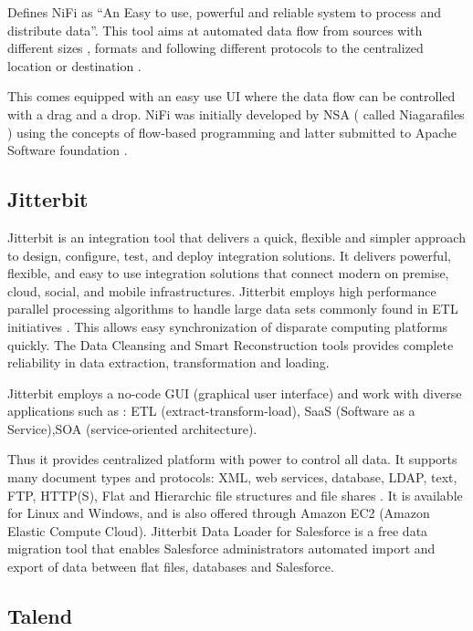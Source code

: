     \cite{www-nifi} Defines NiFi as ``An Easy to use, powerful and
    reliable system to process and distribute data''.  This tool aims
    at automated data flow from sources with different sizes , formats
    and following different protocols to the centralized location or
    destination \cite{www-hortanworks}.
    
    This comes equipped with an easy use UI where the data flow can be
    controlled with a drag and a drop.  NiFi was initially developed
    by NSA ( called Niagarafiles ) using the concepts of flow-based
    programming and latter submitted to Apache Software
    foundation \cite{www-forbes}.
    
\subsection{Jitterbit}

    Jitterbit \cite{datasheet} is an integration tool that delivers a
    quick, flexible and simpler approach to design, configure, test,
    and deploy integration solutions. It delivers powerful, flexible,
    and easy to use integration solutions that connect modern on
    premise, cloud, social, and mobile infrastructures. Jitterbit
    employs high performance parallel processing algorithms to handle
    large data sets commonly found in ETL initiatives
    \cite{www-jitetl}. This allows easy synchronization of disparate
    computing platforms quickly. The Data Cleansing and Smart
    Reconstruction tools provides complete reliability in data
    extraction, transformation and loading.

    Jitterbit employs a no-code GUI (graphical user interface) and
    work with diverse applications such as : ETL
    (extract-transform-load), SaaS (Software as a Service),SOA
    (service-oriented architecture).

    Thus it provides centralized platform with power to control all
    data. It supports many document types and protocols: XML, web
    services, database, LDAP, text, FTP, HTTP(S), Flat and Hierarchic
    file structures and file shares \cite{tech-manual}. It is
    available for Linux and Windows, and is also offered through
    Amazon EC2 (Amazon Elastic Compute Cloud). Jitterbit Data Loader
    for Salesforce is a free data migration tool that enables
    Salesforce administrators automated import and export of data
    between flat files, databases and Salesforce.

\subsection{Talend}

